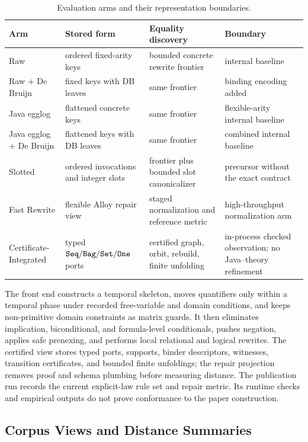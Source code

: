 \begin{table}[H]
\caption{Evaluation arms and their representation boundaries.}
\label{tab:engine-boundary}
\centering
\scriptsize
\setlength{\tabcolsep}{3pt}
\begin{tabular}{@{}p{2.35cm}p{2.7cm}p{3.05cm}p{3.35cm}@{}}
\toprule
Arm & Stored form & Equality discovery & Boundary\\
\midrule
Raw & ordered fixed-arity keys & bounded concrete rewrite frontier & internal baseline\\
Raw + De Bruijn & fixed keys with DB leaves & same frontier & binding encoding added\\
Java egglog & flattened concrete keys & same frontier & flexible-arity internal baseline\\
Java egglog + De Bruijn & flattened keys with DB leaves & same frontier & combined internal baseline\\
Slotted & ordered invocations and integer slots & frontier plus bounded slot canonicalizer & precursor without the exact contract\\
Fast Rewrite & flexible Alloy repair view & staged normalization and reference metric & high-throughput normalization arm\\
Certificate-Integrated & typed $\texttt{Seq}/\texttt{Bag}/\texttt{Set}/\texttt{One}$ ports & certified graph, orbit, rebuild, finite unfolding & in-process checked observation; no Java--theory refinement\\
\bottomrule
\end{tabular}
\end{table}

The front end constructs a temporal skeleton, moves quantifiers only within a
temporal phase under recorded free-variable and domain conditions, and keeps
non-primitive domain constraints as matrix guards.  It then eliminates
implication, biconditional, and formula-level conditionals, pushes negation,
applies safe prenexing, and performs local relational and logical rewrites.
The certified view stores typed ports, supports, binder descriptors,
witnesses, transition certificates, and bounded finite unfoldings; the repair
projection removes proof and schema plumbing before measuring distance.  The
publication run records the current explicit-law rule set and repair metric.
Its runtime checks and empirical outputs do not prove conformance to the paper
construction.

\subsection{Corpus Views and Distance Summaries}

